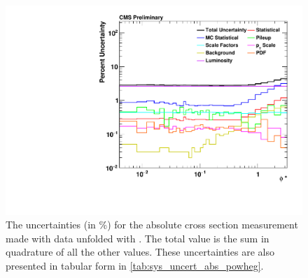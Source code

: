 \begin{figure}[!p]
    \centering
    \includegraphics[width=\textwidth]{figures/data_uncertainty_absolute_powheg_unfolded.pdf}
    \caption[
        The uncertainties for the absolute cross section measurement made with
        data unfolded with \POWHEG.
    ]{
        The uncertainties (in \%) for the absolute cross section measurement
        made with data unfolded with \POWHEG. The total value is the sum in
        quadrature of all the other values. These uncertainties are also
        presented in tabular form in \cref{tab:sys_uncert_abs_powheg}.
    }
    \label{fig:sys_uncert_abs_powheg}
\end{figure}
